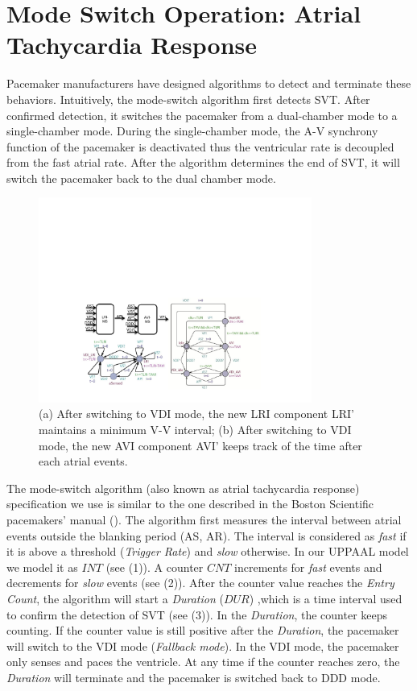 \section{Mode Switch Operation: Atrial Tachycardia Response}
\label{Mode_switch}


Pacemaker manufacturers have designed algorithms to detect and terminate these behaviors. Intuitively, the mode-switch algorithm first detects SVT. After confirmed detection, it switches the pacemaker from a dual-chamber mode to a single-chamber mode. During the single-chamber mode, the A-V synchrony function of the pacemaker is deactivated thus the ventricular rate is decoupled from the fast atrial rate. After the algorithm determines the end of SVT, it will switch the pacemaker back to the dual chamber mode. 
\begin{figure}
		\centering
		\includegraphics[width=0.8\textwidth]{figs/AVI_ms.pdf}
		\caption{\small (a) After switching to \textsf{VDI} mode, the new LRI component \textsf{LRI'} maintains a minimum V-V interval; (b) After switching to \textsf{VDI} mode, the new AVI component \textsf{AVI'} keeps track of the time after each atrial events.}
		\label{fig:avi_ms}
\end{figure}
The mode-switch algorithm (also known as atrial tachycardia response) specification we use is similar to the one described in the Boston Scientific pacemakers' manual (\cite{compass}). The algorithm first measures the interval between atrial events outside the blanking period (AS, AR). The interval is considered as \emph{fast} if it is above a threshold (\emph{Trigger Rate}) and \emph{slow} otherwise. In our UPPAAL model we model it as $INT$ (see  (1)). A counter $CNT$ increments for \emph{fast} events and decrements for \emph{slow} events (see  (2)). After the counter value reaches the \emph{Entry Count}, the algorithm will start a \emph{Duration} ($DUR$) ,which is a time interval used to confirm the detection of SVT (see  (3)). In the \emph{Duration}, the counter keeps counting. If the counter value is still positive after the \emph{Duration}, the pacemaker will switch to the VDI mode (\emph{Fallback mode}). In the VDI mode, the pacemaker only senses and paces the ventricle. At any time if the counter reaches zero, the \emph{Duration} will terminate and the pacemaker is switched back to DDD mode.
